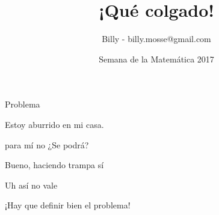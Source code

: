 \documentclass[11pt]{beamer}
\begin{document}
\title{¡Qué colgado!}
\date{Semana de la Matemática 2017}
\author{Billy - billy.mosse@gmail.com}


\begin{frame}
\maketitle
\end{frame}


\begin{frame}{Problema}

	Estoy aburrido en mi casa.
	\bigskip
	
	\bigskip
	
	\bigskip
	
	
\end{frame}

\begin{frame}{para mí no}
	\huge{¿Se podrá?}
\end{frame}


\begin{frame}{Bueno, haciendo trampa sí}
	
\end{frame}

\begin{frame}{Uh así no vale}


\huge{¡Hay que definir bien el problema!}

\end{frame}
\end{document}
